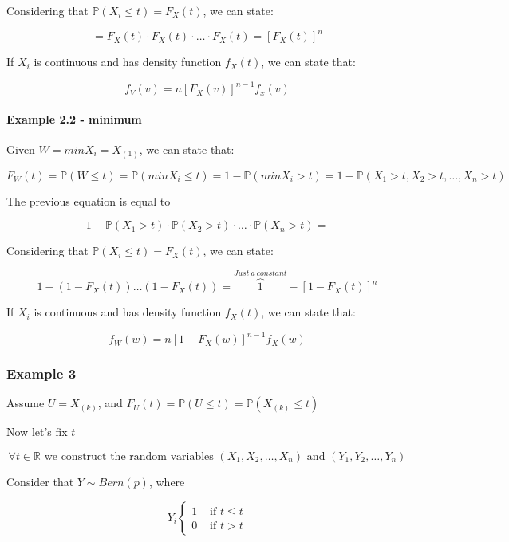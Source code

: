     Considering that \(\mathbb{P} (X_i \leq t ) = F_X (t) \), we can state:

    \[ = F_X(t) \cdot F_X(t) \cdot \ldots \cdot F_X(t) = [F_X(t)]^n \]

    If \(X_i\) is continuous and has density function \(f_X(t)\), we can state that:

    \[ f_V (v) = n \left[ F_X(v) \right]^{n-1} f_x (v) \]

    \paragraph{Example 2.2 - minimum}

    Given \(W = min X_i = X_{(1)}\), we can state that:

    \[F_W(t) = \mathbb{P} (W \leq t) = \mathbb{P} (min X_i \leq t) = 1 - \mathbb{P} (min X_i > t) = 1 - \mathbb{P} (X_1 > t, X_2 > t, \ldots, X_n > t) \]
    
    The previous equation is equal to 

    \[ 1- \mathbb{P} (X_1 > t) \cdot \mathbb{P} (X_2 > t) \cdot \ldots \cdot \mathbb{P} (X_n > t) = \]

    Considering that \(\mathbb{P} (X_i \leq t ) = F_X (t) \), we can state:

    \[ 1- (1- F_X(t)) \ldots (1-F_X(t))  = \overbrace{1}^{Just \ a \ constant} - [1 - F_X(t)]^n \]

    If \(X_i\) is continuous and has density function \(f_X(t)\), we can state that:

    \[ f_W (w) = n [1 - F_X(w)]^{n-1} f_X(w) \]

\subsubsection{Example 3}

Assume \( U = X_{(k)} \), and \( F_U (t) = \mathbb{P} (U \leq t) = \mathbb{P} (X_{(k)} \leq t) \)

Now let's fix \(t\)

\[\forall t \in \mathbb{R} \text{ we construct the random variables } (X_1, X_2, \ldots , X_n) \text{ and } (Y_1, Y_2, \ldots , Y_n)  \]

Consider that \(Y \sim Bern (p)\), where 

\[ Y_i \begin{cases}
    1 & \text{ if } t \leq t \\
    0 & \text{ if } t > t
\end{cases} \]

